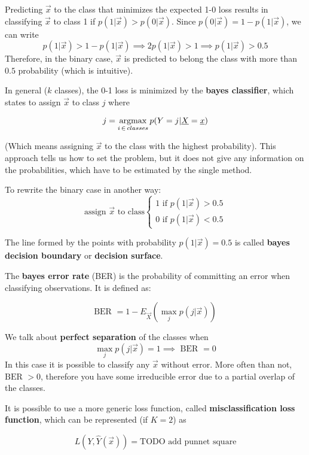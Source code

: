     Predicting $\vec{x}$ to the class that minimizes the expected 1-0 loss results in 
    classifying $\vec{x}$ to class 1 if $p(1|\vec{x}) > p(0|\vec{x})$.
    Since $p(0|\vec{x}) = 1 - p(1|\vec{x})$, we can write
    $$p(1|\vec{x}) > 1 - p(1|\vec{x}) \implies 2p(1|\vec{x}) > 1 \implies p(1|\vec{x})>0.5$$ 
    Therefore, in the binary case, $\vec{x}$ is predicted to belong the class with more than $0.5$ probability (which is intuitive).

    In general ($k$ classes), the 0-1 loss is minimized by the \textbf{bayes classifier}, which states to assign $\vec{x}$ to class $j$ where 

    $$j = \operatorname*{argmax}_{i\,\in\,classes} p(Y = j|\underline{X} = \underline{x})$$

    (Which means assigning $\vec{x}$ to the class with the highest probability).
    This approach tells us how to set the problem, but it does not give any information on the probabilities, which have to be estimated by the single method.

    To rewrite the binary case in another way:
    $$
    \text{assign } \vec{x} \text{ to class} 
    \begin{cases}
      1 \text{ if } p(1|\vec{x}) > 0.5\\
      0 \text{ if } p(1|\vec{x}) < 0.5
    \end{cases}
    $$
    
    The line formed by the points with probability $p(1|\vec{x}) = 0.5$ is called \textbf{bayes decision boundary} or \textbf{decision surface}.

    The \textbf{bayes error rate} (BER) is the probability of committing an error when classifying observations. It is defined as:
    
    $$\text{BER } = 1 - E_{\vec{X}}\left(\max_{j} p(j|\vec{x})\right)$$
    
    We talk about \textbf{perfect separation } of the classes when 
    $$\max_{j} p(j|\vec{x}) = 1 \implies \text{ BER } = 0$$
    In this case it is possible to classify any $\vec{x}$ without error. More often than not,
    $\text{BER } > 0$, therefore you have some irreducible error due to a partial overlap of the classes.

    It is possible to use a more generic loss function, called \textbf{misclassification loss function}, which can be represented (if $K = 2$) as

    $$L(Y, \hat{Y}(\vec{x})) = \text{TODO add punnet square}$$ 


